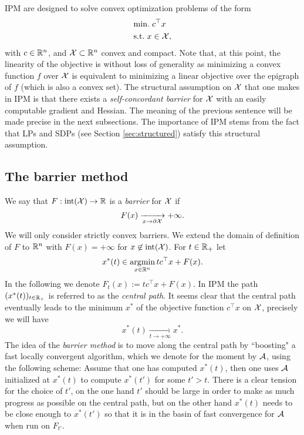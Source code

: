 IPM are designed to solve convex optimization problems of the form
\begin{align*}
& \mathrm{min.} \; c^{\top} x \\
& \text{s.t.} \; x \in \mathcal{X} ,
\end{align*}
with $c \in \mathbb{R}^n$, and $\mathcal{X} \subset \mathbb{R}^n$ convex and compact. 
Note that, at this point, the linearity of the objective is without loss of generality as minimizing a convex function $f$ over $\mathcal{X}$ is equivalent to minimizing a linear objective over the epigraph of $f$ (which is also a convex set). The structural assumption on $\mathcal{X}$ that one makes in IPM is that there exists a {\em self-concordant barrier} for $\mathcal{X}$ with an easily computable gradient and Hessian. The meaning of the previous sentence will be made precise in the next subsections. The importance of IPM stems from the fact that LPs and SDPs (see Section \ref{sec:structured}) satisfy this structural assumption.

\subsection{The barrier method} \label{sec:barriermethod}
We say that $F : \mathrm{int}(\mathcal{X}) \rightarrow \mathbb{R}$ is a {\em barrier} for $\mathcal{X}$ if 
$$F(x) \xrightarrow[x \to \partial \mathcal{X}]{} +\infty .$$
We will only consider strictly convex barriers. We extend the domain of definition of $F$ to $\mathbb{R}^n$ with $F(x) = +\infty$ for $x \not\in \mathrm{int}(\mathcal{X})$. For $t \in \mathbb{R}_+$ let
$$x^*(t) \in \mathop{\mathrm{argmin}}_{x \in \mathbb{R}^n} t c^{\top} x + F(x) .$$
In the following we denote $F_t(x) := t c^{\top} x + F(x)$.
In IPM the path $(x^*(t))_{t \in \mathbb{R}_+}$ is referred to as the {\em central path}. It seems clear that the central path eventually leads to the minimum $x^*$ of the objective function $c^{\top} x$ on $\mathcal{X}$, precisely we will have
$$x^*(t) \xrightarrow[t \to +\infty]{} x^* .$$
The idea of the {\em barrier method} is to move along the central path by ``boosting" a fast locally convergent algorithm, which we denote for the moment by $\mathcal{A}$, using the following scheme: Assume that one has computed $x^*(t)$, then one uses $\mathcal{A}$ initialized at $x^*(t)$ to compute $x^*(t')$ for some $t'>t$. There is a clear tension for the choice of $t'$, on the one hand $t'$ should be large in order to make as much progress as possible on the central path, but on the other hand $x^*(t)$ needs to be close enough to $x^*(t')$ so that it is in the basin of fast convergence for $\mathcal{A}$ when run on $F_{t'}$. 

